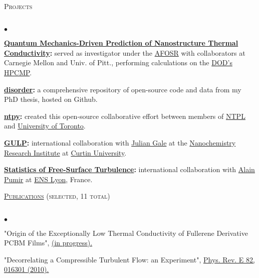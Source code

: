 \documentclass{article}
\newcommand{\lineunder}{\vspace*{-8pt} \\ \hspace*{-18pt} \hrulefill \\}
\newcommand{\header}[1]{{\hspace*{-15pt}\vspace*{6pt} \textsc{#1}} \vspace*{-6pt} \lineunder}
\newenvironment{achievements}{\begin{list}{$\bullet$}{\topsep 0pt \itemsep -2pt}}{\vspace*{4pt}\end{list}}
\begin{document}
\header{Projects}
\begin{achievements}

\item \textbf{\href{http://ntpl.me.cmu.edu/research.html}{Quantum Mechanics-Driven Prediction of Nanostructure Thermal Conductivity}:}
served as investigator under the 
\href{http://www.wpafb.af.mil/afrl/afosr/}{AFOSR} with collaborators at Carnegie Mellon and Univ. of Pitt., performing 
calculations on the \href{http://www.hpcmo.hpc.mil/cms2/index.php}{DOD's HPCMP}.

\item \textbf{\href{https://github.com/jasonlarkin/disorder}{disorder}:} a comprehensive repository of open-source code and data from my PhD thesis, hosted on Github.

\item \textbf{\href{https://github.com/ntpl/ntpy}{ntpy}:} created this open-source  collaborative effort between members of \href{http://ntpl.me.cmu.edu/}{NTPL} and \href{http://www.mie.utoronto.ca/labs/atoms/}{University of Toronto}.

\item \textbf{\href{http://projects.ivec.org/gulp/}{GULP}:} international collaboration with \href{http://nanochemistry.curtin.edu.au/people/staff.cfm/J.Gale}{Julian Gale} at the 
\href{http://nanochemistry.curtin.edu.au/}{Nanochemistry Research Institute} at \href{http://www.curtin.edu.au/}{Curtin University}.

\item \textbf{\href{http://jasonlarkin.github.io/projects-ms.html}{Statistics of Free-Surface Turbulence}:} international collaboration with \href{http://perso.ens-lyon.fr/alain.pumir/Pumir_webpage.html}{Alain Pumir} at \href{http://www.ens-lyon.eu/annuaire/m-pumir-alain-83656.kjsp?RH=ZYZYZYZYZYZYZYZYZYZYZY}{ENS Lyon}, France.

\end{achievements}

\header{\href{http://jasonlarkin.github.io/pub.html}{Publications} (selected, 11 total)}
\begin{achievements}
\item "Origin of the Exceptionally Low Thermal Conductivity of Fullerene Derivative  PCBM Films", 
\href{http://jasonlarkin.github.io/projects-phd-pcbm.html}{(in progress).}
\item "Decorrelating a Compressible Turbulent Flow: an Experiment", \href{http://pre.aps.org/abstract/PRE/v82/i1/e016301}{Phys. Rev. E 82, 016301 (2010).}
\end{achievements}
\end{document}
